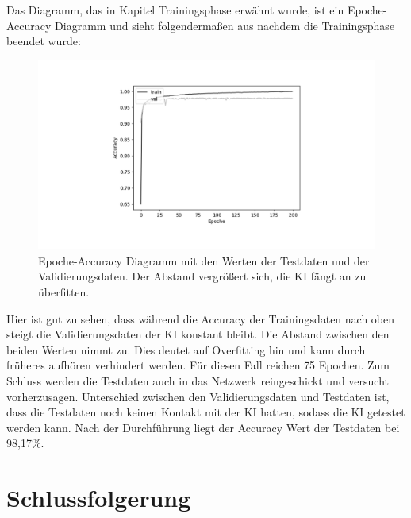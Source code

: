 \documentclass[11pt]{article}
\begin{document}
Das Diagramm, das in Kapitel Trainingsphase erwähnt wurde, ist ein Epoche-Accuracy Diagramm und sieht folgendermaßen aus nachdem die Trainingsphase
beendet wurde:
\begin{figure}[h]
    \centering
    \includegraphics[width=340pt, keepaspectratio]{images/accuracydiagram}
    \caption[Epoche-Accuracy Diagramm]{Epoche-Accuracy Diagramm mit den Werten der Testdaten und der Validierungsdaten. Der Abstand vergrößert sich,
    die KI fängt an zu überfitten.}
\end{figure}
Hier ist gut zu sehen, dass während die Accuracy der Trainingsdaten nach oben steigt die Validierungsdaten der KI konstant bleibt. Die Abstand zwischen den
beiden Werten nimmt zu. Dies deutet auf Overfitting hin und kann durch früheres aufhören verhindert werden. Für diesen Fall reichen
75 Epochen. Zum Schluss werden die Testdaten auch in das Netzwerk reingeschickt und versucht vorherzusagen. Unterschied zwischen den Validierungsdaten
und Testdaten ist, dass die Testdaten noch keinen Kontakt mit der KI hatten, sodass die KI getestet werden kann.
Nach der Durchführung liegt der Accuracy Wert der Testdaten bei 98,17\%.

\section{Schlussfolgerung}
\end{document}

